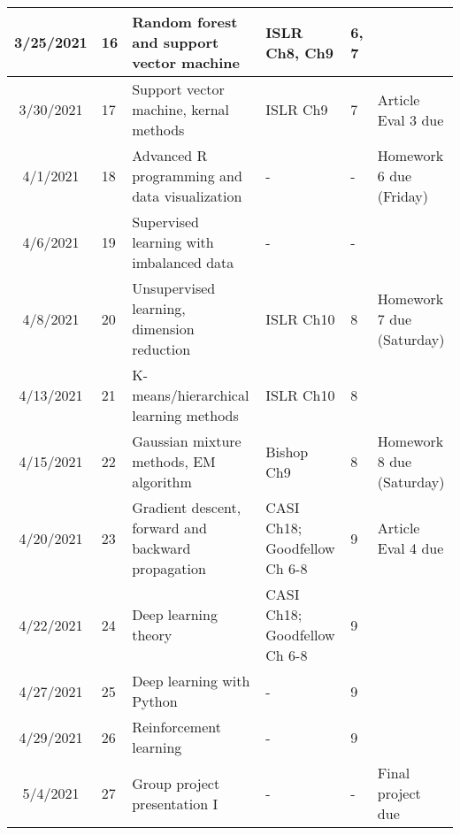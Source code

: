 \documentclass[11pt]{article}
\begin{document}
\begin{center}
\begin{tabular}{c|m{3em}|m{21em}|m{7em}|m{3em}|m{8em}}
3/25/2021 & 16 & Random forest and support vector machine & ISLR Ch8, Ch9 &  6, 7 &  \\ \hline
3/30/2021 & 17 & Support vector machine, kernal methods & ISLR Ch9 & 7 & Article Eval 3 due\\ \hline
4/1/2021 & 18 & Advanced R programming and data visualization & - & - & Homework 6 due (Friday)\\ \hline
4/6/2021 & 19 & Supervised learning with imbalanced data & - & - & \\ \hline
4/8/2021 & 20 & Unsupervised learning, dimension reduction & ISLR Ch10 & 8 & Homework 7 due (Saturday)\\ \hline
4/13/2021 & 21 & K-means/hierarchical learning methods & ISLR Ch10 & 8 &\\ \hline
4/15/2021 & 22 & Gaussian mixture methods, EM algorithm & Bishop Ch9 & 8 & Homework 8 due (Saturday)\\ \hline
4/20/2021 & 23 & Gradient descent, forward and backward propagation & CASI Ch18; Goodfellow Ch 6-8 & 9 & Article Eval 4 due\\ \hline
4/22/2021 & 24 & Deep learning theory & CASI Ch18; Goodfellow Ch 6-8 & 9 & \\ \hline
4/27/2021 & 25 & Deep learning with Python & - & 9 & \\ \hline
4/29/2021 & 26 & Reinforcement learning & - & 9 & \\ \hline
5/4/2021 & 27 & Group project presentation I & - & - & Final project due
\end{tabular}
\end{center}
\end{document}
